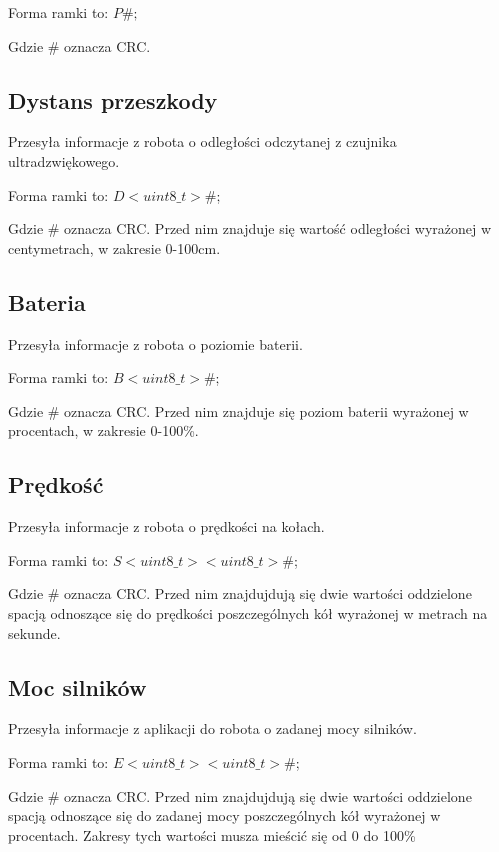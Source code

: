 \documentclass[12pt,a4paper,polish]{article}
\begin{document}
  Forma ramki to: $P\#;$

  Gdzie \# oznacza CRC.



  \subsection{Dystans przeszkody}
  Przesyła informacje z robota o odległości odczytanej z czujnika ultradzwiękowego.
  
  Forma ramki to: $D<uint8\_t>\#$;
  \newline

  Gdzie \# oznacza CRC. Przed nim znajduje się wartość odległości wyrażonej 
  w centymetrach, w zakresie 0-100cm.



  \subsection{Bateria}
  Przesyła informacje z robota o poziomie baterii.

  Forma ramki to: $B<uint8\_t>\#$;
  \newline

  Gdzie \# oznacza CRC. Przed nim znajduje się poziom baterii wyrażonej 
  w procentach, w zakresie 0-100\%.



  \subsection{Prędkość}
  Przesyła informacje z robota o prędkości na kołach.

  Forma ramki to: $S<uint8\_t> <uint8\_t>\#$;
  \newline

  Gdzie \# oznacza CRC. Przed nim znajdujdują się dwie wartości oddzielone spacją
  odnoszące się do prędkości poszczególnych kół wyrażonej w metrach na sekunde.



  \subsection{Moc silników}
  Przesyła informacje z aplikacji do robota o zadanej mocy silników.

  Forma ramki to: $E<uint8\_t> <uint8\_t>\#$;
  \newline

  Gdzie \# oznacza CRC. Przed nim znajdujdują się dwie wartości oddzielone spacją
  odnoszące się do zadanej mocy poszczególnych kół wyrażonej w procentach.
  Zakresy tych wartości musza mieścić się od 0 do 100\%
\end{document}
